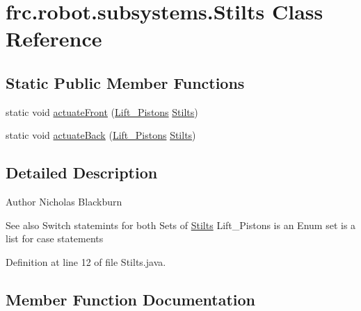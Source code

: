 \hypertarget{classfrc_1_1robot_1_1subsystems_1_1Stilts}{}\section{frc.\+robot.\+subsystems.\+Stilts Class Reference}
\label{classfrc_1_1robot_1_1subsystems_1_1Stilts}
\subsection*{Static Public Member Functions}
\begin{DoxyCompactItemize}
\item 
static void \hyperlink{classfrc_1_1robot_1_1subsystems_1_1Stilts_af50dae1fe4775c73cefb856685f1e99a}{actuate\+Front} (\hyperlink{enumfrc_1_1robot_1_1Enums_1_1Lift__Pistons}{Lift\+\_\+\+Pistons} \hyperlink{classfrc_1_1robot_1_1subsystems_1_1Stilts}{Stilts})
\item 
static void \hyperlink{classfrc_1_1robot_1_1subsystems_1_1Stilts_a450a870f59c6692eaac864def617ec71}{actuate\+Back} (\hyperlink{enumfrc_1_1robot_1_1Enums_1_1Lift__Pistons}{Lift\+\_\+\+Pistons} \hyperlink{classfrc_1_1robot_1_1subsystems_1_1Stilts}{Stilts})
\end{DoxyCompactItemize}


\subsection{Detailed Description}
\begin{DoxyAuthor}{Author}
Nicholas Blackburn 
\end{DoxyAuthor}
\begin{DoxySeeAlso}{See also}
Switch statemints for both Sets of \hyperlink{classfrc_1_1robot_1_1subsystems_1_1Stilts}{Stilts} Lift\+\_\+\+Pistons is an Enum set is a list for case statements 
\end{DoxySeeAlso}


Definition at line 12 of file Stilts.\+java.



\subsection{Member Function Documentation}
\mbox{\label{classfrc_1_1robot_1_1subsystems_1_1Stilts_a450a870f59c6692eaac864def617ec71}} 
